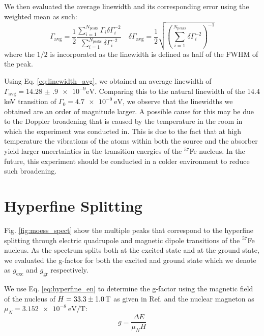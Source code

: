 \documentclass[a4paper]{report}
\numberwithin{equation}{section}
\begin{document}
We then evaluated the average linewidth and its corresponding error using the weighted mean as such: 
\begin{equation}
    \Gamma_{\mathrm{avg}} = \frac{1}{2}\frac{\sum_{i=1}^{N_\mathrm{peaks}} \Gamma_i \delta\Gamma_i^{-2}}{\sum_{i=1}^{N_\mathrm{peaks}} \delta\Gamma_i^{-2}}
    \quad \delta \Gamma_\mathrm{avg} = \frac{1}{2}\sqrt{\left(\sum_{i=1}^{N_\mathrm{peaks}} \delta\Gamma_i^{-2}\right)^{-1}}
    \label{eq:linewidth_avg}
\end{equation}
where the $1 / 2$ is incorporated as the linewidth is defined as half of the FWHM of the peak. 

Using Eq. \ref{eq:linewidth_avg}, we obtained an average linewidth of $\Gamma_{\mathrm{avg}} = \num[{scientific-notation = true}]{14.28(90)e-9}\si{\electronvolt}$. 
Comparing this to the natural linewidth of the 14.4 keV transition of $\Gamma_0 = \SI{4.7e-9}{\electronvolt}$, we observe that the linewidths we obtained are an 
order of magnitude larger. A possible cause for this may be due to the Doppler broadening that is caused by the temperature in the room
in which the experiment was conducted in. This is due to the fact that at high temperature the vibrations of the atoms within both the source and 
the absorber yield larger uncertainties in the transition energies of the $^{57}$Fe nucleus. In the future, this experiment should be 
conducted in a colder environment to reduce such broadening.\par 

\section{Hyperfine Splitting}

Fig. \ref{fig:moess_spect} show the multiple peaks that correspond to the hyperfine splitting through electric quadrupole and 
magnetic dipole transitions of the $^{57}$Fe nucleus. As the spectrum splits both at the excited state and at the ground state, we evaluated
the g-factor for both the excited and ground state which we denote as $g_{\mathrm{exc}}$ and $g_{\mathrm{gr}}$ respectively. \par

We use Eq. \ref{eq:hyperfine_en} to determine the g-factor using the magnetic field of the nucleus of $H = \SI{33.3 \pm 1.0}{\tesla}$ as given in Ref. \cite{k2212016}
and the nuclear magneton as $\mu_N = \SI{3.152e-8}{\electronvolt\per\tesla}$:
\begin{equation}
    g = \frac{\Delta E}{\mu_N H}
    \label{eq:hyperfine_gfac}
\end{equation}
\end{document}
